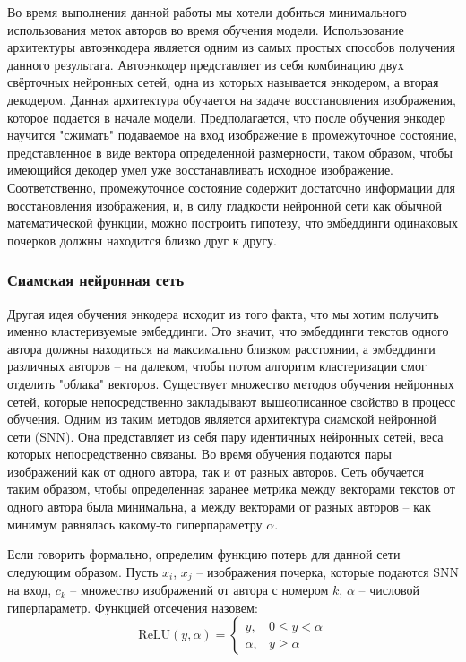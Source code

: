     Во время выполнения данной работы мы хотели добиться минимального использования меток авторов во время обучения модели. Использование архитектуры автоэнкодера является одним из самых простых способов получения данного результата. Автоэнкодер представляет из себя комбинацию двух свёрточных нейронных сетей, одна из которых называется энкодером, а вторая декодером. Данная архитектура обучается на задаче восстановления изображения, которое подается в начале модели. Предполагается, что после обучения энкодер научится "сжимать" подаваемое на вход изображение в промежуточное состояние, представленное в виде вектора определенной размерности, таком образом, чтобы имеющийся декодер умел уже восстанавливать исходное изображение. Соответственно, промежуточное состояние содержит достаточно информации для восстановления изображения, и, в силу гладкости нейронной сети как обычной математической функции, можно построить гипотезу, что эмбеддинги одинаковых почерков должны находится близко друг к другу. 

\subsubsection{Сиамская нейронная сеть}

    Другая идея обучения энкодера исходит из того факта, что мы хотим получить именно кластеризуемые эмбеддинги. Это значит, что эмбеддинги текстов одного автора должны находиться на максимально близком расстоянии, а эмбеддинги различных авторов -- на далеком, чтобы потом алгоритм кластеризации смог отделить "облака" векторов. Существует множество методов обучения нейронных сетей, которые непосредственно закладывают вышеописанное свойство в процесс обучения. Одним из таким методов является архитектура сиамской нейронной сети (SNN). Она представляет из себя пару идентичных нейронных сетей, веса которых непосредственно связаны. Во время обучения подаются пары изображений как от одного автора, так и от разных авторов. Сеть обучается таким образом, чтобы определенная заранее метрика между векторами текстов от одного автора была минимальна, а между векторами от разных авторов -- как минимум равнялась какому-то гиперпараметру $\alpha$. 

    Если говорить формально, определим функцию потерь для данной сети следующим образом. Пусть
$x_i$, $x_j$ -- изображения почерка, которые подаются SNN на вход, $c_k$ -- множество изображений от автора с номером $k$, $\alpha$ -- числовой гиперпараметр. Функцией отсечения назовем: 
$$
    \text{ReLU}(y, \alpha) = 
\begin{cases}
    y,& 0 \le y < \alpha \\
    \alpha,& y \geq \alpha
\end{cases}
$$

